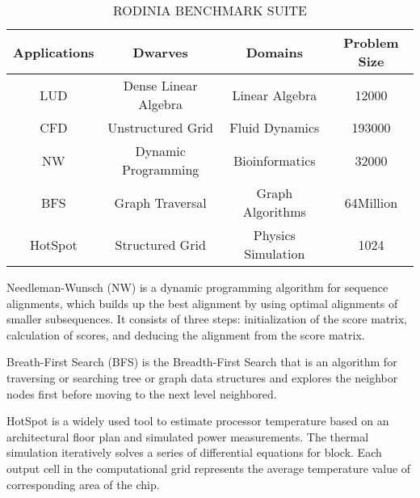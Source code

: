 
\begin{table}[htbp]
  \centering
    \caption{RODINIA BENCHMARK SUITE}
  \begin{adjustbox}{width=0.5\textwidth}
    \begin{tabular}{cccc}
    \toprule
    Applications & Dwarves & Domains & Problem Size  \\
    \midrule
    LUD & Dense Linear Algebra & Linear Algebra & 12000 \\
    CFD & Unstructured Grid & Fluid Dynamics & 193000 \\
    NW & Dynamic Programming & Bioinformatics & 32000 \\
    BFS & Graph Traversal & Graph Algorithms & 64Million \\
    HotSpot & Structured Grid & Physics Simulation & 1024 \\
    \bottomrule
    \end{tabular}%
    \label{tab:benchmarks}
  \end{adjustbox}

\end{table}%


  Needleman-Wunsch (NW) is a dynamic programming algorithm for sequence alignments, which builds up the best alignment by using optimal alignments of smaller subsequences. It consists of three steps: initialization of the score matrix, calculation of scores, and deducing the alignment from the score matrix.

  Breath-First Search (BFS) is the Breadth-First Search that is an algorithm for traversing or searching tree or graph data structures and explores the neighbor nodes first before moving to the next level neighbored.

  HotSpot is a widely used tool to estimate processor temperature based on an architectural floor plan and simulated power measurements. The thermal simulation iteratively solves a series of differential equations for block. Each output cell in the computational grid represents the average temperature value of corresponding area of the chip.
